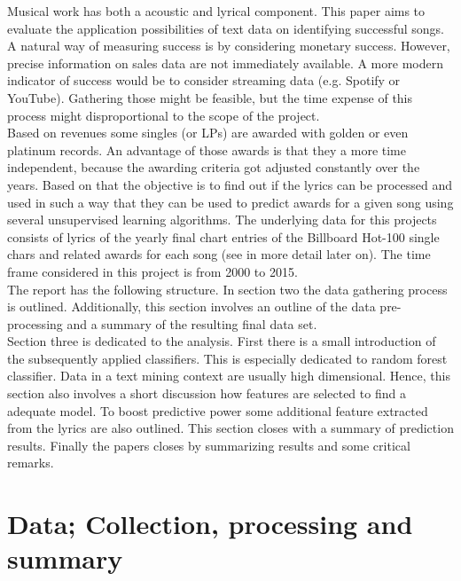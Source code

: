 \documentclass[12pt,a4paper,bibliography=totocnumbered,listof=totocnumbered]{scrartcl}
\begin{document}
Musical work has both a acoustic and lyrical component. This paper aims to evaluate the application possibilities of text data on identifying successful songs. A natural way of measuring success is by considering monetary success. However, precise information on sales data are not  immediately available. A more modern indicator of success would be to consider streaming data (e.g. Spotify or YouTube). Gathering those might be feasible, but the time expense of this process might disproportional to the scope of the project. \\
Based on revenues some singles (or LPs) are awarded with golden or even platinum records. An advantage of those awards is that they a more  time independent, because the awarding criteria got adjusted constantly over the years.
Based on that the objective is to find out if the lyrics can be processed and used in such a way that they can be used to predict awards for a given song using several unsupervised learning algorithms. The underlying data for this projects consists of lyrics of the yearly final chart entries of the Billboard Hot-100 single chars and related awards for each song (see in more detail later on). The time frame considered in this project is from 2000 to 2015. \\
The report has the following structure. In section two the data gathering process is outlined. Additionally, this section involves an outline of the data pre-processing and a summary of the resulting final data set.\\
Section three is dedicated to the analysis. First there is a small introduction of the subsequently applied classifiers. This is especially dedicated to random forest classifier. Data in a text mining context are usually high dimensional. Hence, this section also  involves a short discussion how features are selected to find a adequate model. To boost predictive power some additional feature extracted from the lyrics are also outlined. This section closes with a summary of prediction results.
Finally the papers closes by summarizing results and some critical remarks.


\section{Data; Collection, processing and summary}
\end{document}
